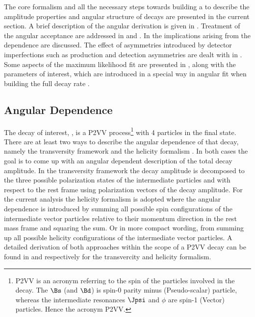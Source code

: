 
The core formalism and all the necessary steps towards building a \pdf to describe the amplitude properties and angular structure of \BJpsiKst decays are presented in
the current section. A brief description of the angular \pdf derivation is given in .
Treatment of the angular acceptance are addressed in  and .
In  the implications arising from the \mkpi dependence are discussed.
The effect of asymmetries introduced by detector imperfections such as production and detection asymmetries are dealt with
in . Some aspects of the maximum likelihood fit are presented in ,
along with the \ACP parameters of interest, which are introduced in a special way in angular fit when building the full decay rate \pdf.


\subsection{Angular Dependence}
\label{Diferential_Decay_Rate}
The decay of interest, \BJpsiKst, is a P2VV 
process\footnote{P2VV is an acronym referring to the spin of the particles involved in the decay.
The $\Bs$ (and $\Bd$) is spin-0 parity minus (Pseudo-scalar) particle, whereas the intermediate resonances $\Jpsi$ and $\phi$ 
are spin-1 (Vector) particles. Hence the acronym P2VV.}
with 4 particles in the final state. There are at least two ways to describe the angular dependence of that decay, namely the transversity framework \cite{transvFrameworkI,transvFrameworkII}
and the helicity formalism \cite{helicityFormI,helicityFormII}. In both cases the goal is to come up with an angular dependent description of the total decay amplitude.
In the transversity framework the decay amplitude is decomposed to the three possible polarization states of the intermediate particles \Jpsi and \Kst with respect to 
the \Bs rest frame using polarization vectors of the decay amplitude. For the current analysis the helicity formalism is adopted where the angular dependence is 
introduced by summing all possible spin configurations of the intermediate vector particles relative to their momentum direction in the \Bs rest mass frame
and squaring the sum. Or in more compact wording, from summing up all possible helicity configurations of the intermediate vector particles. A detailed derivation of both 
approaches within the scope of a P2VV decay can be found in \cite{daanThesis} and \cite{jeroenThesis} respectively for the transvercity and helicity formalism.

